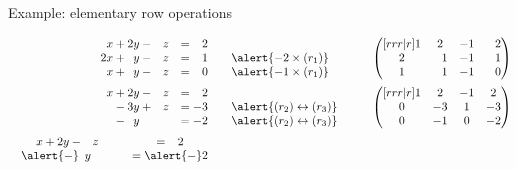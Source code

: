 \documentclass%
[handout]%
{beamer}
\begin{document}
\begin{frame}[label=ERO-example]{Example: elementary row operations}

\vspace*{-20pt}
\begin{alignat*}{2}
  \begin{matrix}
    \hphantom{2}x +            2y - \hphantom{-}z  & = \hphantom{-}2 \\
               2x + \hphantom{2}y - \hphantom{-}z  & = \hphantom{-}1 \\
    \hphantom{2}x + \hphantom{2}y - \hphantom{-}z  & = \hphantom{-}0
  \end{matrix}
        & \qquad
  \begin{matrix}
     \\
   \alert{-2\times (r_1)} \\
   \alert{-1\times (r_1)}
  \end{matrix}
        \qquad &
  \begin{pmatrix}[rrr|r]
    1 &  2 & -1 & \hphantom{-}2 \\
    2 & \hphantom{-}1 & -1 & \hphantom{-}1 \\
    1 & \hphantom{-}1 & -1 & \hphantom{-}0
  \end{pmatrix}&
  \\[2pt]
  \begin{matrix}
    \hphantom{2}x +            2y - \hphantom{-}z  & = \hphantom{-}2 \\
    \hphantom{2x} -            3y + \hphantom{-}z  & = -3 \\
    \hphantom{2x} - \hphantom{2}y  \hphantom{--z}  & = -2  \end{matrix}
& \qquad
  \begin{matrix}
     \\
   \alert{(r_2) \leftrightarrow (r_3)} \\
   \alert{(r_2) \leftrightarrow (r_3)}
  \end{matrix}
        \qquad &
  \begin{pmatrix}[rrr|r]
    1 & 2 & -1 & 2 \\
    0 & -3 & 1 & -3 \\
    0 & -1 & 0 & -2
  \end{pmatrix}&
    \\[2pt]
  \begin{matrix}
    \hphantom{2}x +            2y - \hphantom{-}z  & = \hphantom{-}2 \\
    \hphantom{2x}\alert{-}\hphantom{2}y  \hphantom{--z}  & = \alert{-}2 \\

\end{matrix}
\end{alignat*}
\end{frame}
\end{document}
